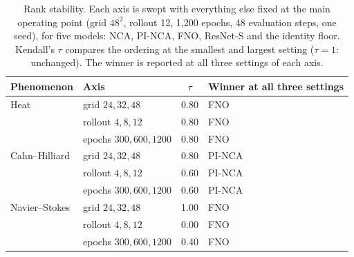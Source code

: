 \begin{table}[t]
\centering
\caption{Rank stability. Each axis is swept with everything else fixed at the main
operating point (grid $48^2$, rollout 12, 1{,}200 epochs, 48 evaluation steps, one seed),
for five models: NCA, PI-NCA, FNO, ResNet-S and the identity floor. Kendall's $\tau$
compares the ordering at the smallest and largest setting ($\tau=1$: unchanged). The
winner is reported at all three settings of each axis.}
\label{tab:scaling}
\small
\begin{tabularx}{\linewidth}{@{}llcX@{}}
\toprule
Phenomenon & Axis & $\tau$ & Winner at all three settings \\
\midrule
Heat & grid $24,32,48$           & 0.80 & FNO \\
     & rollout $4,8,12$          & 0.80 & FNO \\
     & epochs $300,600,1200$     & 0.80 & FNO \\
\midrule
Cahn--Hilliard & grid $24,32,48$       & 0.80 & PI-NCA \\
               & rollout $4,8,12$      & 0.60 & PI-NCA \\
               & epochs $300,600,1200$ & 0.60 & PI-NCA \\
\midrule
Navier--Stokes & grid $24,32,48$       & 1.00 & FNO \\
               & rollout $4,8,12$      & 0.00 & FNO \\
               & epochs $300,600,1200$ & 0.40 & FNO \\
\bottomrule
\end{tabularx}
\end{table}
